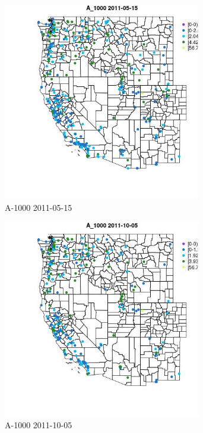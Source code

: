 \begin{figure} 
\centering  
\includegraphics[width=0.77\textwidth]{Code_Outputs/ML_input_report_ML_input_PM25_Step5_part_d_de_duplicated_aves_ML_input_MapObsA_10002011-05-15.jpg} 
\caption{\label{fig:ML_input_report_ML_input_PM25_Step5_part_d_de_duplicated_aves_ML_inputMapObsA_10002011-05-15}A-1000 2011-05-15} 
\end{figure} 
 

\begin{figure} 
\centering  
\includegraphics[width=0.77\textwidth]{Code_Outputs/ML_input_report_ML_input_PM25_Step5_part_d_de_duplicated_aves_ML_input_MapObsA_10002011-10-05.jpg} 
\caption{\label{fig:ML_input_report_ML_input_PM25_Step5_part_d_de_duplicated_aves_ML_inputMapObsA_10002011-10-05}A-1000 2011-10-05} 
\end{figure} 
 

